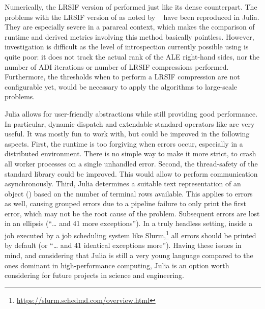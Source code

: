 Numerically, the \ac{LRSIF} version of  performed just like its dense counterpart.
The problems with the \ac{LRSIF} version of  as noted by \citeauthor*{Lang2015}~\cite{Lang2015,Lang2017} have been reproduced in Julia.
They are especially severe in a parareal context,
which makes the comparison of runtime and derived metrics involving this method basically pointless.
However, investigation is difficult as the level of introspection
currently possible using  is quite poor:
it does not track the actual rank of the \ac{ALE} right-hand sides,
nor the number of \ac{ADI} iterations or number of \ac{LRSIF} compressions performed.
Furthermore, the thresholds when to perform a \ac{LRSIF} compression are not configurable yet,
would be necessary to apply the algorithms to large-scale problems.

Julia allows for user-friendly abstractions while still providing good performance.
In particular, dynamic dispatch and extendable standard operators like \julia{(+)} are very useful.
It was mostly fun to work with, but could be improved in the following aspects.
First, the runtime is too forgiving when errors occur,
especially in a distributed environment.
There is no simple way to make it more strict, \eg to crash all worker processes on a single unhandled error.
Second, the thread-safety of the standard library could be improved.
This would allow  to perform communication asynchronously.
Third, Julia determines a suitable text representation of an object (\eg {}) based on the number of terminal rows available.
This applies to errors as well, causing \eg grouped errors due to a pipeline failure to only print the first error,
which may not be the root cause of the problem.
Subsequent errors are lost in an ellipsis (\enquote{\ldots{} and 41 more exceptions}).
In a truly headless setting,
\eg inside a job executed by a job scheduling system like Slurm,\footnote{\url{https://slurm.schedmd.com/overview.html}}
all errors should be printed by default (or \enquote{\ldots{} and 41 identical exceptions more}).
Having these issues in mind,
and considering that Julia is still a very young language compared to the ones dominant in high-performance computing,
Julia is an option worth considering for future projects in science and engineering.
